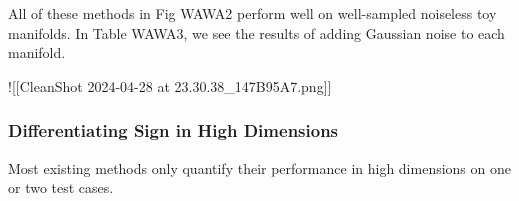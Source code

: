 \documentclass[
  letterpaper,
  DIV=11,
  numbers=noendperiod]{scrartcl}
\begin{document}
All of these methods in Fig WAWA2 perform well on well-sampled noiseless
toy manifolds. In Table WAWA3, we see the results of adding Gaussian
noise to each manifold.

!{[}{[}CleanShot 2024-04-28 at 23.30.38\_147B95A7.png{]}{]}

\subsubsection{Differentiating Sign in High
Dimensions}\label{differentiating-sign-in-high-dimensions}

Most existing methods only quantify their performance in high dimensions
on one or two test cases.

\begin{figure}[H]

\end{figure}
\end{document}
